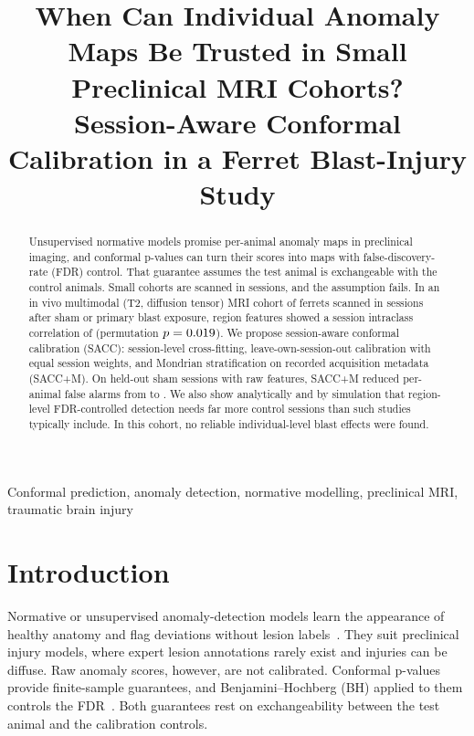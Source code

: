 \documentclass{article}
\title{When Can Individual Anomaly Maps Be Trusted in Small Preclinical MRI Cohorts?\\Session-Aware Conformal Calibration in a Ferret Blast-Injury Study}
\begin{document}
\maketitle

\begin{abstract}
Unsupervised normative models promise per-animal anomaly maps in preclinical imaging, and conformal p-values can turn their scores into maps with false-discovery-rate (FDR) control. That guarantee assumes the test animal is exchangeable with the control animals. Small cohorts are scanned in sessions, and the assumption fails. In an in vivo multimodal (T2, diffusion tensor) MRI cohort of \Nanimals{} ferrets scanned in \Nsessions{} sessions after sham or primary blast exposure, region features showed a session intraclass correlation of \ICC{} (permutation $p=0.019$). We propose session-aware conformal calibration (SACC): session-level cross-fitting, leave-own-session-out calibration with equal session weights, and Mondrian stratification on recorded acquisition metadata (SACC+M). On held-out sham sessions with raw features, SACC+M reduced per-animal false alarms from \FAnaive{} to \FAsaccm{}. We also show analytically and by simulation that region-level FDR-controlled detection needs far more control sessions than such studies typically include. In this cohort, no reliable individual-level blast effects were found.
\end{abstract}

\begin{keywords}
Conformal prediction, anomaly detection, normative modelling, preclinical MRI, traumatic brain injury
\end{keywords}

\section{Introduction}
\label{sec:intro}
Normative or unsupervised anomaly-detection models learn the appearance of healthy anatomy and flag deviations without lesion labels~\cite{baur2021,marquand2016}. They suit preclinical injury models, where expert lesion annotations rarely exist and injuries can be diffuse. Raw anomaly scores, however, are not calibrated. Conformal p-values provide finite-sample guarantees, and Benjamini--Hochberg (BH) applied to them controls the FDR~\cite{bates2023,bh1995}. Both guarantees rest on exchangeability between the test animal and the calibration controls.
\end{document}
